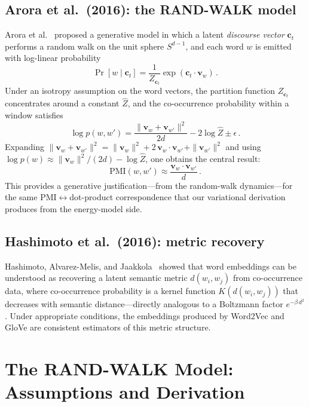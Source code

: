 \documentclass[11pt]{article}
\newcommand{\vw}{\bm{v}}
\newcommand{\PMI}{\mathrm{PMI}}
\begin{document}
\subsection{Arora et al.\ (2016): the RAND-WALK model}

Arora et al.~\cite{arora2016} proposed a generative model in which a latent \emph{discourse vector} $\bm{c}_t$ performs a random walk on the unit sphere $S^{d-1}$, and each word $w$ is emitted with log-linear probability
\begin{equation}\label{eq:arora-emission}
    \Pr[w \mid \bm{c}_t] = \frac{1}{Z_{\bm{c}_t}} \exp(\bm{c}_t \cdot \vw_w)\,.
\end{equation}
Under an isotropy assumption on the word vectors, the partition function $Z_{\bm{c}_t}$ concentrates around a constant $\hat{Z}$, and the co-occurrence probability within a window satisfies
\begin{equation}\label{eq:arora-main}
    \log p(w, w') = \frac{\|\vw_w + \vw_{w'}\|^2}{2d} - 2\log \hat{Z} \pm \epsilon\,.
\end{equation}
Expanding $\|\vw_w + \vw_{w'}\|^2 = \|\vw_w\|^2 + 2\,\vw_w \cdot \vw_{w'} + \|\vw_{w'}\|^2$ and using $\log p(w) \approx \|\vw_w\|^2 / (2d) - \log \hat{Z}$, one obtains the central result:
\begin{equation}\label{eq:arora-pmi}
    \PMI(w, w') \approx \frac{\vw_w \cdot \vw_{w'}}{d}\,.
\end{equation}
This provides a generative justification---from the random-walk dynamics---for the same PMI$\leftrightarrow$dot-product correspondence that our variational derivation produces from the energy-model side.

\subsection{Hashimoto et al.\ (2016): metric recovery}

Hashimoto, Alvarez-Melis, and Jaakkola~\cite{hashimoto2016} showed that word embeddings can be understood as recovering a latent semantic metric $d(w_i, w_j)$ from co-occurrence data, where co-occurrence probability is a kernel function $K(d(w_i, w_j))$ that decreases with semantic distance---directly analogous to a Boltzmann factor $e^{-\beta\, d^2}$. Under appropriate conditions, the embeddings produced by Word2Vec and GloVe are consistent estimators of this metric structure.

\section{The RAND-WALK Model: Assumptions and Derivation}\label{sec:randwalk}
\end{document}
